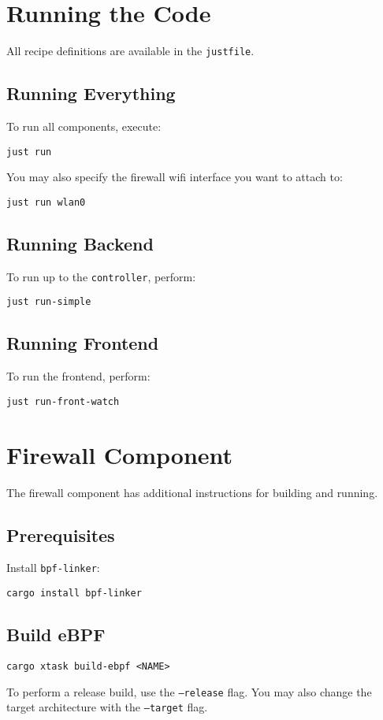 \documentclass{article}
\begin{document}
\section{Running the Code}
All recipe definitions are available in the \texttt{justfile}.

\subsection{Running Everything}
To run all components, execute:
\begin{verbatim}
just run
\end{verbatim}

You may also specify the firewall wifi interface you want to attach to:
\begin{verbatim}
just run wlan0
\end{verbatim}

\subsection{Running Backend}
To run up to the \texttt{controller}, perform:
\begin{verbatim}
just run-simple
\end{verbatim}

\subsection{Running Frontend}
To run the frontend, perform:
\begin{verbatim}
just run-front-watch
\end{verbatim}

\section{Firewall Component}
The firewall component has additional instructions for building and running.

\subsection{Prerequisites}
Install \texttt{bpf-linker}:
\begin{verbatim}
cargo install bpf-linker
\end{verbatim}

\subsection{Build eBPF}
\begin{verbatim}
cargo xtask build-ebpf <NAME>
\end{verbatim}
To perform a release build, use the \texttt{--release} flag. You may also change the target architecture with the \texttt{--target} flag.
\end{document}

